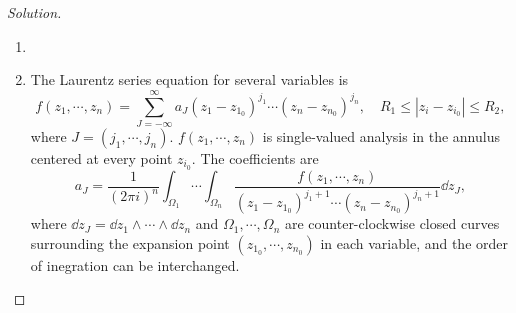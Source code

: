 \documentclass[twoside,openany,12pt]{beautynote}
\begin{document}
\begin{proof}[Solution]
    \begin{enumerate}
        \item 
        \item The Laurentz series equation for several variables is 
        \[
            f(z_1,\cdots,z_n)=\sum_{J=-\infty}^{\infty} a_J (z_1-z_{1_0})^{j_1} \cdots (z_n-z_{n_0})^{j_n},\quad R_1\leqslant |z_i-z_{i_0}|\leqslant R_2,
        \]
        where $J=(j_1,\cdots,j_n)$.  $f(z_1,\cdots,z_n)$ is single-valued analysis in the annulus centered at every point $z_{i_0}$. The coefficients are
        \[
            a_J=\frac{1}{(2\pi i)^n} \int_{\Omega_1}\cdots \int_{\Omega_n} \frac{f(z_1,\cdots,z_n)}{(z_1-z_{1_0})^{j_1+1} \cdots (z_n-z_{n_0})^{j_n+1}}\dd z_J,
        \]
        where $\dd z_J=\dd z_1\wedge\cdots \wedge\dd z_n$ and $\Omega_1,\cdots,\Omega_n$ are counter-clockwise closed curves surrounding the expansion point $(z_{1_0},\cdots,z_{n_0})$ in each variable, and the order of inegration can be interchanged.


\end{enumerate}
\end{proof}
\end{document}
